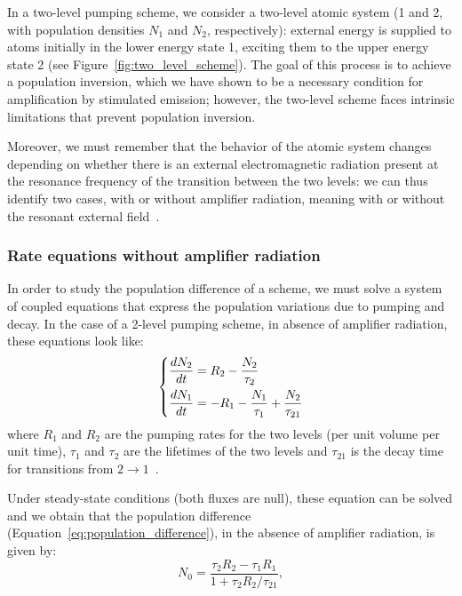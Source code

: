 \documentclass[prl,twocolumn]{revtex4-1}
\begin{document}
In a two-level pumping scheme, we consider a two-level atomic system (1 and 2, with population densities $N_1$ and $N_2$, respectively): external energy is supplied to atoms initially in the lower energy state 1, exciting them to the upper energy state 2 (see Figure~\ref{fig:two_level_scheme}). The goal of this process is to achieve a population inversion, which we have shown to be a necessary condition for amplification by stimulated emission; however, the two-level scheme faces intrinsic limitations that prevent population inversion.

Moreover, we must remember that the behavior of the atomic system changes depending on whether there is an external electromagnetic radiation present at the resonance frequency of the transition between the two levels: we can thus identify two cases, with or without amplifier radiation, meaning with or without the resonant external field~\cite{Saleh2007}.

\subsubsection{\textbf{Rate equations without amplifier radiation}}
In order to study the population difference of a scheme, we must solve a system of coupled equations that express the population variations due to pumping and decay. In the case of a 2-level pumping scheme, in absence of amplifier radiation, these equations look like:
%
\begin{equation}
    \begin{dcases}
        \frac{dN_2}{dt} = R_2-\frac{N_2}{\tau_2} \\
        \frac{dN_1}{dt} = -R_1-\frac{N_1}{\tau_1}+\frac{N_2}{\tau_{21}}
    \end{dcases}
    \label{eq:rate_equations_two_levels}
\end{equation}
%
%
where $R_1$ and $R_2$ are the pumping rates for the two levels (per unit volume per unit time), $\tau_1$ and $\tau_2$ are the lifetimes of the two levels and $\tau_{21}$ is the decay time for transitions from $2 \to 1$~\cite{Saleh2007}.

Under steady-state conditions (both fluxes are null), these equation can be solved and we obtain that the population difference (Equation~\eqref{eq:population_difference}), in the absence of amplifier radiation, is given by:
%
\begin{equation}
    \label{eq:N_0_without}
    N_0 = \frac{\tau_2 R_2 - \tau_1 R_1}{1 + \tau_2 R_2 / \tau_{21}},
\end{equation}
%
\end{document}
